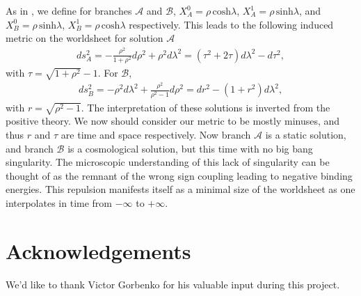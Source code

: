 \documentclass[%
 reprint,
 amsmath,amssymb,
 aps,
]{revtex4-1}
\begin{document}
As in \cite{Dubovsky:2012wk}, we define for branches $\mathcal{A}$ and $\mathcal{B}$, $X_A^0 = \rho
\, \mathrm{cosh} \lambda$, $X_A^1 = \rho \, \mathrm{sinh} \lambda$, and $X_B^0 = \rho
\, \mathrm{sinh} \lambda$, $X_B^1 = \rho \, \mathrm{cosh} \lambda$ respectively. This leads to the
following induced metric on the worldsheet for solution $\mathcal{A}$
\begin{eqnarray}
    ds^2_A = -\frac{\rho^2}{1+\rho^2} d\rho^2 + \rho^2 d \lambda^2 = (\tau^2 + 2 \tau)
    d\lambda^2 - d \tau^2 \nonumber ,
\end{eqnarray}
with $\tau = \sqrt{1 + \rho^2} -1$. For $\mathcal{B}$,
\begin{eqnarray}
    ds^2_B =  - \rho^2 d \lambda^2 + \frac{\rho^2}{\rho^2 - 1} d \rho^2 = dr^2 - (1 + r^2) d \lambda^2
    \nonumber ,
\end{eqnarray}
with $r = \sqrt{\rho^2 - 1} $.  The interpretation of these solutions is inverted from the positive
theory.  We now should consider our metric to be mostly minuses, and thus $r$ and $\tau$ are time
and space respectively. Now branch $\mathcal{A}$ is a static solution, and branch $\mathcal{B}$ is a
cosmological solution, but this time with no big bang singularity.  The microscopic understanding of
this lack of singularity can be thought of as the remnant of the wrong sign coupling leading to
negative binding energies.  This repulsion manifests itself as a minimal size of the worldsheet as
one interpolates in time from $-\infty$ to $+\infty$.

\section{Acknowledgements}

We'd like to thank Victor Gorbenko for his valuable input during this project.


\end{document}
